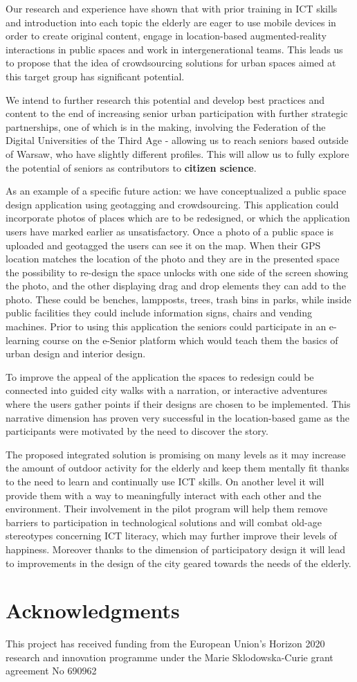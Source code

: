 \documentclass[sigconf]{acmart}
\begin{document}
Our research and experience have shown that with prior training in ICT skills and introduction into each topic the elderly are eager to use mobile devices in order to create original content, engage in location-based augmented-reality interactions in public spaces and work in intergenerational teams. This leads us to propose that the idea of crowdsourcing solutions for urban spaces aimed at this target group has significant potential. 

We intend to further research this potential and develop best practices and content to the end of increasing senior urban participation with further strategic partnerships, one of which is in the making, involving the Federation of the Digital Universities of the Third Age - allowing us to reach seniors based outside of Warsaw, who have slightly different profiles. This will allow us to fully explore the potential of seniors as contributors to \textbf{citizen science}.

As an example of a specific future action: we have conceptualized a public space design application using geotagging and crowdsourcing. This application could incorporate photos of places which are to be redesigned, or which the application users have marked earlier as unsatisfactory. Once a photo of a public space is uploaded and geotagged the users can see it on the map. When their GPS location matches the location of the photo and they are in the presented space the possibility to re-design the space unlocks with one side of the screen showing the photo, and the other displaying drag and drop elements they can add to the photo. These could be benches, lampposts, trees, trash bins in parks, while inside public facilities they could include information signs, chairs and vending machines. Prior to using this application the seniors could participate in an e-learning course on the e-Senior platform which would teach them the basics of urban design and interior design.

To improve the appeal of the application the spaces to redesign could be connected into guided city walks with a narration, or interactive adventures where the users gather points if their designs are chosen to be implemented. This narrative dimension has proven very successful in the location-based game as the participants were motivated by the need to discover the story. 

The proposed integrated solution is promising on many levels as it may increase the amount of outdoor activity for the elderly and keep them mentally fit thanks to the need to learn and continually use ICT skills. On another level it will provide them with a way to meaningfully interact with each other and the environment. Their involvement in the pilot program will help them remove barriers to participation in technological solutions and will combat old-age stereotypes concerning ICT literacy, which may further improve their levels of happiness. Moreover thanks to the dimension of participatory design it will lead to improvements in the design of the city geared towards the needs of the elderly. 

\section{Acknowledgments}
This project has received funding from the European Union's Horizon 2020 research and innovation programme under the Marie Sklodowska-Curie grant agreement No 690962


 
\end{document}
